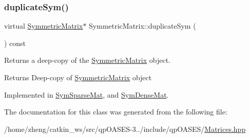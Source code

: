 \mbox{\label{class_symmetric_matrix_a4dacd5fe6d12b5082a90a7336669fce7}} 
\subsubsection{\texorpdfstring{duplicate\+Sym()}{duplicateSym()}}
{\footnotesize\ttfamily virtual \hyperlink{class_symmetric_matrix}{Symmetric\+Matrix}$\ast$ Symmetric\+Matrix\+::duplicate\+Sym (\begin{DoxyParamCaption}{ }\end{DoxyParamCaption}) const\hspace{0.3cm}{\ttfamily [pure virtual]}}

Returns a deep-\/copy of the \hyperlink{class_symmetric_matrix}{Symmetric\+Matrix} object. \begin{DoxyReturn}{Returns}
Deep-\/copy of \hyperlink{class_symmetric_matrix}{Symmetric\+Matrix} object 
\end{DoxyReturn}


Implemented in \hyperlink{class_sym_sparse_mat_a624d9155d154c2f72fdccb697d14f62a}{Sym\+Sparse\+Mat}, and \hyperlink{class_sym_dense_mat_abbb79b4991d4fc1dde962dff52fec198}{Sym\+Dense\+Mat}.



The documentation for this class was generated from the following file\+:\begin{DoxyCompactItemize}
\item 
/home/zheng/catkin\+\_\+ws/src/qp\+O\+A\+S\+E\+S-\/3../include/qp\+O\+A\+S\+E\+S/\hyperlink{_matrices_8hpp}{Matrices.\+hpp}\end{DoxyCompactItemize}

